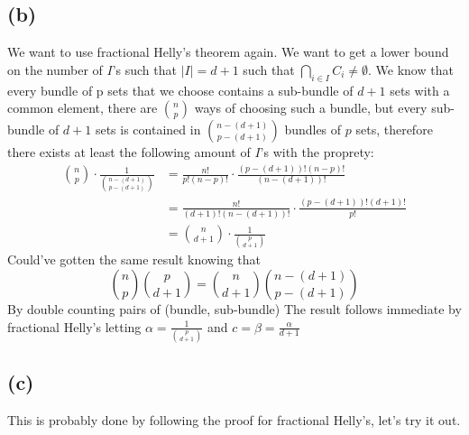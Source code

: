 \documentclass[a4paper,11pt]{article}
\begin{document}
\subsection*{(b)}
We want to use fractional Helly's theorem again. We want to get a lower bound on the number of $I$'s such that $|I| = d+1$ such that $\displaystyle \bigcap_{i \in I} C_i \neq \emptyset$. We know that every bundle of p sets that we choose contains a sub-bundle of $d+1$ sets with a common element, there are $\displaystyle \binom{n}{p}$ ways of choosing such a bundle, but every sub-bundle of $d+1$ sets is contained in $\displaystyle \binom{n-(d+1)}{p-(d+1)}$ bundles of $p$ sets, therefore there exists at least the following amount of $I$'s with the proprety: 
\begin{align*}
	\binom{n}{p} \cdot \frac{1}{\binom{n-(d+1)}{p-(d+1)}} &= \frac{n!}{p! (n-p)!} \cdot \frac{(p-(d+1))! (n-p)!}{(n- (d+1))!}\\
							      &= \frac{n!}{(d+1)! (n-(d+1))!} \cdot \frac{(p-(d+1))!(d+1)!}{p!}\\
							      &= \binom{n}{d+1} \cdot \frac{1}{\binom{p}{d+1}}
\end{align*}
Could've gotten the same result knowing that
$$
	\binom{n}{p}\binom{p}{d+1} = \binom{n}{d+1}\binom{n-(d+1)}{p-(d+1)}
$$
By double counting pairs of (bundle, sub-bundle)
The result follows immediate by fractional Helly's letting $\alpha = \frac{1}{\binom{p}{d+1}}$ and $c = \beta = \frac{\alpha}{d+1}$

\subsection*{(c)}
This is probably done by following the proof for fractional Helly's, let's try it out. 
\end{document}

